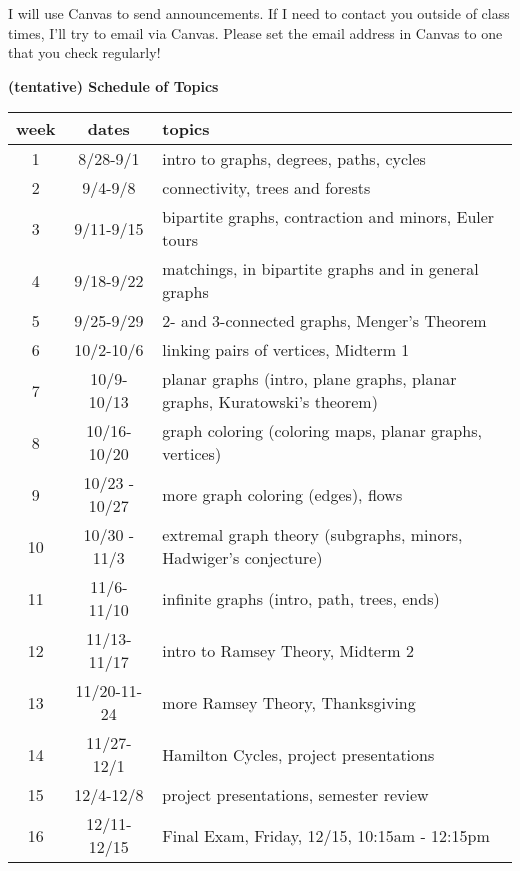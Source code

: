 \documentclass[12pt]{article}
\begin{document}
I will use Canvas to send announcements.  If I need to contact you outside of class times, I'll try to email via Canvas.  Please set the email address in Canvas to one that you check regularly!



\begin{center}
\textbf{(tentative) Schedule of Topics}\\

\begin{tabular}{c | c || p{}}
week & dates &topics \\
\hline \hline
1& 8/28-9/1&intro to graphs, degrees, paths, cycles\\ \hline
2& 9/4-9/8& connectivity, trees and forests\\ \hline
3& 9/11-9/15 & bipartite graphs, contraction and minors, Euler tours\\ \hline
4& 9/18-9/22& matchings, in bipartite graphs and in general graphs\\ \hline
5& 9/25-9/29& 2- and 3-connected graphs, Menger's Theorem\\ \hline
6& 10/2-10/6& linking pairs of vertices, Midterm 1\\ \hline
7& 10/9-10/13& planar graphs (intro, plane graphs, planar graphs, Kuratowski's theorem)\\ \hline
8& 10/16-10/20& graph coloring (coloring maps, planar graphs, vertices)\\ \hline
9& 10/23 - 10/27 &more graph coloring (edges), flows\\ \hline
10& 10/30 - 11/3& extremal graph theory (subgraphs, minors, Hadwiger's conjecture) \\ \hline
11& 11/6-11/10& infinite graphs (intro, path, trees, ends)\\ \hline
12& 11/13-11/17& intro to Ramsey Theory, Midterm 2\\ \hline
13& 11/20-11-24& more Ramsey Theory, Thanksgiving\\ \hline
14& 11/27-12/1&Hamilton Cycles, project presentations\\ \hline
15& 12/4-12/8& project presentations, semester review\\ \hline
16& 12/11-12/15& Final Exam, Friday, 12/15, 10:15am - 12:15pm\\ 
\end{tabular}
\end{center}
\end{document}
